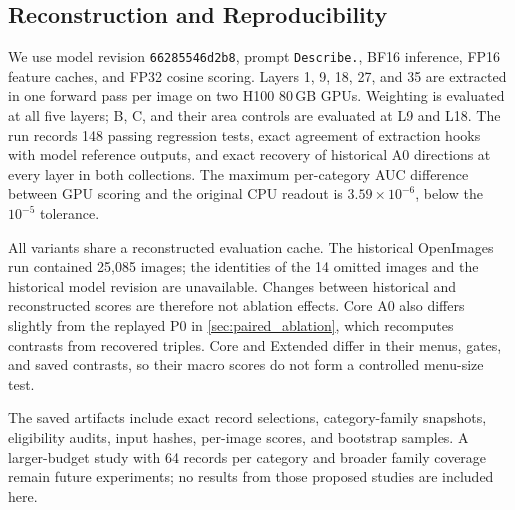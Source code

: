 \subsection{Reconstruction and Reproducibility}

We use model revision \texttt{66285546d2b8}, prompt
\texttt{Describe.}, BF16 inference, FP16 feature caches, and FP32 cosine
scoring. Layers 1, 9, 18, 27, and 35 are extracted in one forward pass
per image on two H100 80\,GB GPUs. Weighting is evaluated at all five
layers; B, C, and their area controls are evaluated at L9 and L18.
The run records 148 passing regression tests, exact agreement of
extraction hooks with model reference outputs, and exact recovery of
historical A0 directions at every layer in both collections. The maximum
per-category AUC difference between GPU scoring and the original CPU
readout is \(3.59\times10^{-6}\), below the \(10^{-5}\) tolerance.

All variants share a reconstructed evaluation cache. The historical
OpenImages run contained 25,085 images; the identities of the 14 omitted
images and the historical model revision are unavailable. Changes between
historical and reconstructed scores are therefore not ablation effects.
Core A0 also differs slightly from the replayed P0 in
\cref{sec:paired_ablation}, which recomputes contrasts from recovered
triples. Core and Extended differ in their menus, gates, and saved
contrasts, so their macro scores do not form a controlled menu-size test.

The saved artifacts include exact record selections, category-family
snapshots, eligibility audits, input hashes, per-image scores, and
bootstrap samples. A larger-budget study with 64 records per category
and broader family coverage remain future experiments; no results from
those proposed studies are included here.
